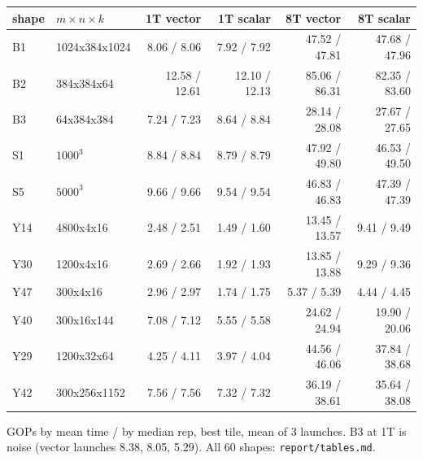 \documentclass[10pt,a4paper]{article}
\begin{document}
\medskip
\begin{tabular}{@{}llrrrr@{}}
\toprule
shape & $m\times n\times k$ & 1T vector & 1T scalar & 8T vector & 8T scalar \\
\midrule
B1 & 1024x384x1024 & 8.06 / 8.06 & 7.92 / 7.92 & 47.52 / 47.81 & 47.68 / 47.96 \\
B2 & 384x384x64 & 12.58 / 12.61 & 12.10 / 12.13 & 85.06 / 86.31 & 82.35 / 83.60 \\
B3 & 64x384x384 & 7.24 / 7.23 & 8.64 / 8.84 & 28.14 / 28.08 & 27.67 / 27.65 \\
S1 & $1000^3$ & 8.84 / 8.84 & 8.79 / 8.79 & 47.92 / 49.80 & 46.53 / 49.50 \\
S5 & $5000^3$ & 9.66 / 9.66 & 9.54 / 9.54 & 46.83 / 46.83 & 47.39 / 47.39 \\
\midrule
Y14 & 4800x4x16 & 2.48 / 2.51 & 1.49 / 1.60 & 13.45 / 13.57 & 9.41 / 9.49 \\
Y30 & 1200x4x16 & 2.69 / 2.66 & 1.92 / 1.93 & 13.85 / 13.88 & 9.29 / 9.36 \\
Y47 & 300x4x16 & 2.96 / 2.97 & 1.74 / 1.75 & 5.37 / 5.39 & 4.44 / 4.45 \\
Y40 & 300x16x144 & 7.08 / 7.12 & 5.55 / 5.58 & 24.62 / 24.94 & 19.90 / 20.06 \\
Y29 & 1200x32x64 & 4.25 / 4.11 & 3.97 / 4.04 & 44.56 / 46.06 & 37.84 / 38.68 \\
Y42 & 300x256x1152 & 7.56 / 7.56 & 7.32 / 7.32 & 36.19 / 38.61 & 35.64 / 38.08 \\
\bottomrule
\end{tabular}
\normalsize

GOPs by mean time / by median rep, best tile, mean of 3 launches. B3 at 1T is noise (vector launches 8.38, 8.05,
5.29). All 60 shapes: \texttt{report/tables.md}.
\end{document}
